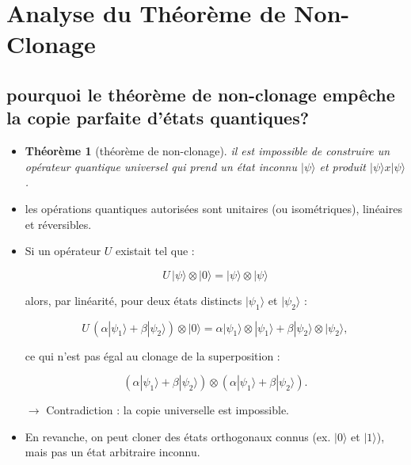 \documentclass[12pt,a4paper]{article}
\newtheorem{theorem}{Théorème}
\begin{document}
	 \section{Analyse du Théorème de Non-Clonage}
	 \subsection{pourquoi le théorème de non-clonage empêche la copie
	 	parfaite d'états quantiques?}
	 	\begin{itemize}
	 	\item \begin{theorem}[théorème de non-clonage]
	 		
	 		il est impossible de construire un opérateur quantique universel qui prend un état inconnu $ |\psi\rangle$ et produit $|\psi\rangle x |\psi\rangle$ .
	 		
	 		\end{theorem}
	 	\item les opérations quantiques autorisées sont unitaires (ou isométriques), linéaires et réversibles.
	 	\item Si un opérateur $U$ existait tel que :
	 	
	 	\[
	 	U \, |\psi\rangle \otimes |0\rangle = |\psi\rangle \otimes |\psi\rangle
	 	\]
	 	
	 	alors, par linéarité, pour deux états distincts $|\psi_1\rangle$ et $|\psi_2\rangle$ :
	 	
	 	\[
	 	U \, (\alpha|\psi_1\rangle + \beta|\psi_2\rangle) \otimes |0\rangle = \alpha|\psi_1\rangle \otimes |\psi_1\rangle + \beta|\psi_2\rangle \otimes |\psi_2\rangle,
	 	\]
	 	
	 	ce qui n'est pas égal au clonage de la superposition :
	 	
	 	\[
	 	(\alpha|\psi_1\rangle + \beta|\psi_2\rangle) \otimes (\alpha|\psi_1\rangle + \beta|\psi_2\rangle).
	 	\]
	 	
	 	$\rightarrow$ Contradiction : la copie universelle est impossible.
	 	
	 	\item En revanche, on peut cloner des états orthogonaux connus (ex. $|0\rangle$ et $|1\rangle$), mais pas un état arbitraire inconnu.
	\end{itemize}
\end{document}
